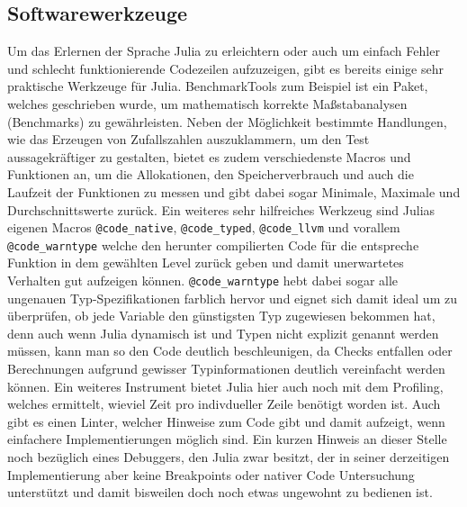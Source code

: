 \documentclass[proseminar,german,utf8]{zihpub}
\begin{document}
\subsection{Softwarewerkzeuge}

Um das Erlernen der Sprache Julia zu erleichtern oder auch um einfach Fehler und schlecht funktionierende Codezeilen aufzuzeigen, gibt es bereits einige sehr praktische Werkzeuge für Julia. BenchmarkTools zum Beispiel ist ein Paket, welches geschrieben wurde, um mathematisch korrekte Maßstabanalysen (Benchmarks) zu gewährleisten. Neben der Möglichkeit bestimmte Handlungen, wie das Erzeugen von Zufallszahlen auszuklammern, um den Test aussagekräftiger zu gestalten, bietet es zudem verschiedenste Macros und Funktionen an, um die Allokationen, den Speicherverbrauch und auch die Laufzeit der Funktionen zu messen und gibt dabei sogar Minimale, Maximale und Durchschnittswerte zurück. Ein weiteres sehr hilfreiches Werkzeug sind Julias eigenen Macros \verb|@code_native|, \verb|@code_typed|, \verb|@code_llvm| und vorallem \verb|@code_warntype| welche den herunter compilierten Code für die entspreche Funktion in dem gewählten Level zurück geben und damit unerwartetes Verhalten gut aufzeigen können. \verb|@code_warntype| hebt dabei sogar alle ungenauen Typ-Spezifikationen farblich hervor und eignet sich damit ideal um zu überprüfen, ob jede Variable den günstigsten Typ zugewiesen bekommen hat, denn auch wenn Julia dynamisch ist und Typen nicht explizit genannt werden müssen, kann man so den Code deutlich beschleunigen, da Checks entfallen oder Berechnungen aufgrund gewisser Typinformationen deutlich vereinfacht werden können. Ein weiteres Instrument bietet Julia hier auch noch mit dem Profiling, welches ermittelt, wieviel Zeit pro indivdueller Zeile benötigt worden ist. Auch gibt es einen Linter, welcher Hinweise zum Code gibt und damit aufzeigt, wenn einfachere Implementierungen möglich sind. Ein kurzen Hinweis an dieser Stelle noch bezüglich eines Debuggers, den Julia zwar besitzt, der in seiner derzeitigen Implementierung aber keine Breakpoints oder nativer Code Untersuchung unterstützt und damit bisweilen doch noch etwas ungewohnt zu bedienen ist.
\end{document}
